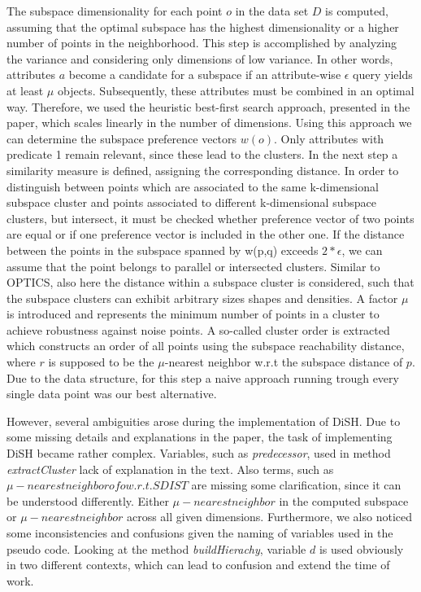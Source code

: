 \documentclass{article}
\begin{document}
The subspace dimensionality for each point $o$ in the data set $D$ is computed, assuming that the optimal subspace has the highest dimensionality or a higher number of points in the neighborhood. This step is accomplished by analyzing the variance and considering only dimensions of low variance.  In other words, attributes $a$ become a candidate for a subspace if an attribute-wise $\epsilon$ query yields at least $\mu$ objects. Subsequently, these attributes must be combined in an optimal way. Therefore, we used the heuristic best-first search approach, presented in the paper, which scales linearly in the number of dimensions. Using this approach we can determine the subspace preference vectors $w(o)$. Only attributes with predicate 1 remain relevant, since these lead to the clusters. In the next step a similarity measure is defined, assigning the corresponding distance. In order to distinguish between points which are associated to the same k-dimensional subspace cluster and points associated to different k-dimensional subspace clusters, but intersect, it must be checked whether preference vector of two points are equal or if one preference vector is included in the other one. If the distance between the points in the subspace spanned by w(p,q) exceeds $2*\epsilon$, we can assume that the point belongs to parallel or intersected clusters. Similar to OPTICS, also here the distance within a subspace cluster is considered, such that the subspace clusters can exhibit arbitrary sizes shapes and densities. A factor $\mu$ is introduced and represents the minimum number of points in a cluster to achieve robustness against noise points. A so-called cluster order is extracted which constructs an order of all points using the subspace reachability distance, where $r$ is supposed to be the $\mu$-nearest neighbor w.r.t the subspace distance of $p$. Due to the data structure, for this step a naive approach running trough every single data point was our best alternative.\par  


However, several ambiguities arose during the implementation of DiSH. Due to some missing details and explanations in the paper, the task of implementing DiSH became rather complex. Variables, such as \emph{predecessor}, used in method \emph{extractCluster} lack of explanation in the text. Also terms, such as $\mu - nearest neighbor of o w.r.t. SDIST$ are missing some clarification, since it can be understood differently. Either $\mu -nearest neighbor$ in the computed subspace or $\mu -nearest neighbor$ across all given dimensions. Furthermore, we also noticed some inconsistencies and confusions given the naming of variables used in the pseudo code. Looking at the method \emph{buildHierachy}, variable $d$ is used obviously in two different contexts, which can lead to confusion and extend the time of work.    
\end{document}
